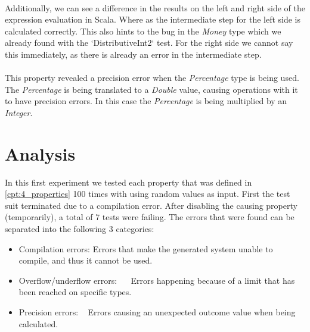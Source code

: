 \\
Additionally, we can see a difference in the results on the left and right side of the expression evaluation in Scala. Where as the intermediate step for the left side is calculated correctly. This also hints to the bug in the \textit{Money} type which we already found with the `DistributiveInt2` test. For the right side we cannot say this immediately, as there is already an error in the intermediate step.\\
\\
This property revealed a precision error when the \textit{Percentage} type is being used. The \textit{Percentage} is being translated to a \textit{Double} value, causing operations with it to have precision errors. In this case the \textit{Percentage} is being multiplied by an \textit{Integer}.

\section{Analysis}
In this first experiment we tested each property that was defined in \autoref{cpt:4_properties} 100 times with using random values as input. First the test suit terminated due to a compilation error. After disabling the causing property (temporarily), a total of 7 tests were failing. The errors that were found can be separated into the following 3 categories:
\begin{itemize}
\item Compilation errors: Errors that make the generated system unable to compile, and thus it cannot be used.
\item Overflow/underflow errors:~ ~ Errors happening because of a limit that has been reached on specific types.
\item Precision errors: ~ Errors causing an unexpected outcome value when being calculated.
\end{itemize}
